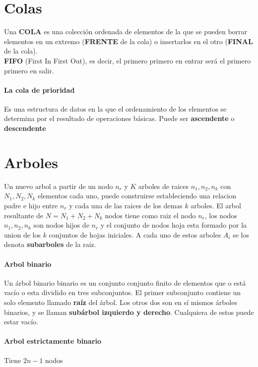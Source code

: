 \documentclass[10pt]{article}
\begin{document}
\section{Colas}

Una \textbf{COLA} es una colección ordenada de elementos
de la que se pueden borrar elementos en un extremo
(\textbf{FRENTE} de la cola) o insertarlos en el otro (\textbf{FINAL} de
la cola).\\
\linebreak
\textbf{FIFO} (First In First Out), es decir, el primero primero en entrar será el primero primero en
salir.\\
\linebreak
\paragraph{La cola de prioridad}
Es una estructura de datos en la que el ordenamiento de los elementos se determina por el resultado de
operaciones básicas. Puede ser \textbf{ascendente} o \textbf{descendente}


\section{Arboles}

Un nuevo arbol a partir de un nodo $n_r$ y $K$ arboles de raices $n_1,n_2,n_k$ con $N_1, N_2, N_k$ elementos cada uno, puede construirse estableciendo una relacion padre e hijo entre $n_r$ y cada una de las raices de los demas $k$ arboles. El arbol resultante de $N = N_1+N_2+N_k$ nodos tiene como raiz el nodo $n_r$, los nodos $n_1,n_2,n_k$ son nodos hijos de $n_r$ y el conjunto de nodos hoja esta formado por la union de los $k$ conjuntos de hojas iniciales. A cada uno de estos arboles $A_i$ se los denota \textbf{subarboles} de la raiz.
\paragraph{Arbol binario}
Un árbol binario binario es un conjunto conjunto finito de
elementos que o está vacío o esta dividido en
tres subconjuntos.
El primer subconjunto contiene un solo elemento
llamado \textbf{raíz} del árbol.
Los otros dos son en sí mismos árboles binarios, y
se llaman \textbf{subárbol izquierdo y derecho}.
Cualquiera de estos puede estar vacío.

\paragraph{Arbol estrictamente binario} Tiene $2n-1$ nodos
\end{document}

